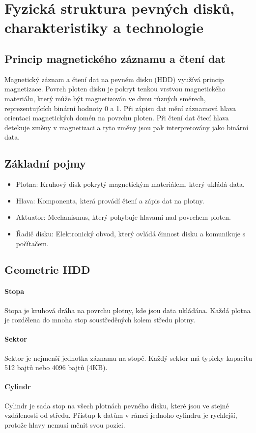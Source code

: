 \section{Fyzická struktura pevných disků, charakteristiky a technologie}
\subsection{Princip magnetického záznamu a čtení dat}
Magnetický záznam a čtení dat na pevném disku (HDD) využívá princip magnetizace. Povrch ploten disku je pokryt tenkou vrstvou magnetického materiálu, který může být magnetizován ve dvou různých směrech, reprezentujících binární hodnoty 0 a 1. Při zápisu dat mění záznamová hlava orientaci magnetických domén na povrchu ploten. Při čtení dat čtecí hlava detekuje změny v magnetizaci a tyto změny jsou pak interpretovány jako binární data.

\subsection{Základní pojmy}
\begin{itemize}
    \item Plotna: Kruhový disk pokrytý magnetickým materiálem, který ukládá data.
    \item Hlava: Komponenta, která provádí čtení a zápis dat na plotny.
    \item Aktuator: Mechanismus, který pohybuje hlavami nad povrchem ploten.
    \item Řadič disku: Elektronický obvod, který ovládá činnost disku a komunikuje s počítačem.
\end{itemize}
\subsection{Geometrie HDD}
\paragraph{Stopa}
Stopa je kruhová dráha na povrchu plotny, kde jsou data ukládána. Každá plotna je rozdělena do mnoha stop soustředěných kolem středu plotny.

\paragraph{Sektor}
Sektor je nejmenší jednotka záznamu na stopě. Každý sektor má typicky kapacitu 512 bajtů nebo 4096 bajtů (4KB).

\paragraph{Cylindr}
Cylindr je sada stop na všech plotnách pevného disku, které jsou ve stejné vzdálenosti od středu. Přístup k datům v rámci jednoho cylindru je rychlejší, protože hlavy nemusí měnit svou pozici.

